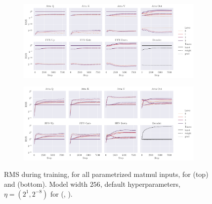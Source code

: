\begin{figure}[h]
    \centering
    \begin{subfigure}{\textwidth}
        \centering
        \includegraphics[width=\textwidth]{arXiv/figures/rms_during_training_mup.pdf}
    \end{subfigure}
    \begin{subfigure}{\textwidth}
        \centering
        \includegraphics[width=\textwidth]{arXiv/figures/rms_during_training_u-mup.pdf}
    \end{subfigure}
    \caption{RMS during training, for all parametrized matmul inputs, for \mup{} (top) and \umup{} (bottom). Model width $256$, default hyperparameters, $\eta=(2^1, 2^{-8})$ for (\umup{}, \mup{}).}
    \label{fig:numerics:rms_during_training}
\end{figure}

